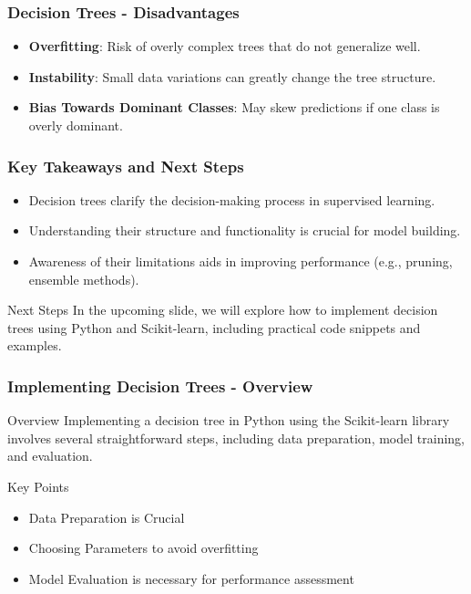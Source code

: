 \documentclass[aspectratio=169]{beamer}
\begin{document}
\begin{frame}[fragile]
    \frametitle{Decision Trees - Disadvantages}
    \begin{itemize}
        \item \textbf{Overfitting}: Risk of overly complex trees that do not generalize well.
        \item \textbf{Instability}: Small data variations can greatly change the tree structure.
        \item \textbf{Bias Towards Dominant Classes}: May skew predictions if one class is overly dominant.
    \end{itemize}
\end{frame}

\begin{frame}[fragile]
    \frametitle{Key Takeaways and Next Steps}
    \begin{itemize}
        \item Decision trees clarify the decision-making process in supervised learning.
        \item Understanding their structure and functionality is crucial for model building.
        \item Awareness of their limitations aids in improving performance (e.g., pruning, ensemble methods).
    \end{itemize}
    
    \begin{block}{Next Steps}
        In the upcoming slide, we will explore how to implement decision trees using Python and Scikit-learn, including practical code snippets and examples.
    \end{block}
\end{frame}

\begin{frame}[fragile]
    \frametitle{Implementing Decision Trees - Overview}
    \begin{block}{Overview}
        Implementing a decision tree in Python using the Scikit-learn library involves several straightforward steps, including data preparation, model training, and evaluation.
    \end{block}
    
    \begin{block}{Key Points}
        \begin{itemize}
            \item Data Preparation is Crucial
            \item Choosing Parameters to avoid overfitting
            \item Model Evaluation is necessary for performance assessment
        \end{itemize}
    \end{block}
\end{frame}
\end{document}
